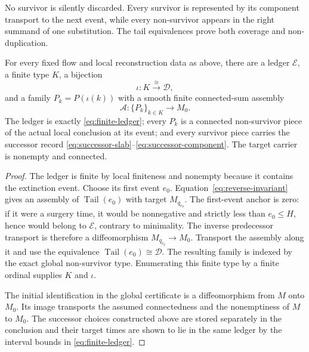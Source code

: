 No survivor is silently discarded.  Every survivor is represented by its
component transport to the next event, while every non-survivor appears in the
right summand of one substitution.  The tail equivalences prove both coverage
and non-duplication.

\begin{theorem}
\label{prop:connected-sum-reconstruction}
For every fixed flow and local reconstruction data as above, there are a ledger $\mathcal E$, a
finite type $K$, a bijection
\[
  \iota:K\xrightarrow{\cong}\mathcal D,
\]
and a family $P_k=P(\iota(k))$ with a smooth finite connected-sum assembly
\[
  \mathscr A:\{P_k\}_{k\in K}\longrightarrow M_0.
\]
The ledger is exactly \eqref{eq:finite-ledger}; every $P_k$ is a connected
non-survivor piece of the actual local conclusion at its event; and every
survivor piece carries the successor record
\eqref{eq:successor-slab}--\eqref{eq:successor-component}.  The target carrier
is nonempty and connected.
\end{theorem}

\begin{proof}
The ledger is finite by local finiteness and nonempty because it contains the
extinction event.  Choose its first event $e_0$.  Equation~\eqref{eq:reverse-invariant}
gives an assembly of $\operatorname{Tail}(e_0)$ with target $M_{q_{e_0}}$.
The first-event anchor is zero: if it were a surgery time, it would be
nonnegative and strictly less than $e_0\leq H$, hence would belong to
$\mathcal E$, contrary to minimality.
The inverse predecessor transport is therefore a diffeomorphism
$M_{q_{e_0}}\to M_0$.  Transport the assembly along it and use the equivalence
$\operatorname{Tail}(e_0)\cong\mathcal D$.  The resulting family is indexed by
the exact global non-survivor type.  Enumerating this finite type by a finite
ordinal supplies $K$ and $\iota$.

The initial identification in the global certificate is a diffeomorphism from
$M$ onto $M_0$.  Its image transports the assumed connectedness and the
nonemptiness of $M$ to $M_0$.  The successor choices constructed above are
stored separately in the conclusion and their target times are shown to lie
in the same ledger by the interval bounds in \eqref{eq:finite-ledger}.
\end{proof}

